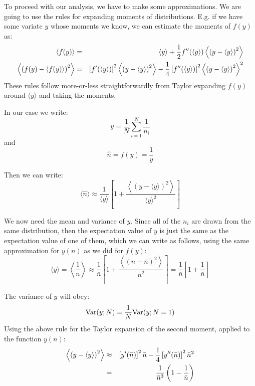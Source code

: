 \begin{enumerate}
\begin{answer}
To proceed with our analysis, we have to make some
approximations. We are going to use the rules for expanding
moments of distributions. E.g. if we have some variate $y$ whose
moments we know, we can estimate the moments of $f(y)$ as:
\begin{eqnarray}
 \langle f(y) \rangle &=& \langle y \rangle + \frac{1}{2}
 f''(\langle y \rangle)
 \left\langle \left(y - \langle y \rangle\right)^2 \right\rangle\cr
 \left\langle \left( f(y) - \langle f(y) \rangle\right)^2 \right\rangle &=&
 \left[f'(\langle y \rangle)\right]^2 
 \left\langle \left(y - \langle y \rangle\right)^2 \right\rangle -
 \frac{1}{4} \left[f''(\langle y \rangle)\right]^2 
 \left\langle \left(y - \langle y \rangle\right)^2 \right\rangle^2
\end{eqnarray}
These rules follow more-or-less straightforwardly from Taylor
expanding $f(y)$ around $\langle y \rangle$ and taking the moments.

In our case we write:
\begin{equation}
 y = \frac{1}{N} \sum_{i=1}^N \frac{1}{n_i}
\end{equation}
and 
\begin{equation}
 \hat n = f(y) = \frac{1}{y}
\end{equation}

Then we can write:
\begin{equation}
\langle \hat n \rangle \approx
\frac{1}{\langle y \rangle}
\left[ 1 + \frac{\left\langle \left(y - \langle
y \rangle\right)^2 \right\rangle}
{\langle y \rangle^2} \right]
\end{equation}

We now need the mean and variance of $y$. Since all of the $n_i$ are
drawn from the same distribution, then the expectation value of $y$ is
just the same as the expectation value of one of them, which we can
write as follows, using the same approximation for $y(n)$ as we did
for $f(y)$:
\begin{equation}
\langle y\rangle = \left\langle \frac{1}{n} \right\rangle
\approx \frac{1}{\bar n} \left[1+ \frac{\left\langle \left(n - \bar
n\right)^2\right\rangle}{\bar n^2}\right]
= \frac{1}{\bar n} \left[ 1 + \frac{1}{\bar n}\right]
\end{equation}

The variance of $y$ will obey:
\begin{equation}
{\rm Var}(y; N) = \frac{1}{N} {\rm Var}(y; N=1)
\end{equation}
Using the above rule for the Taylor expansion of the second moment,
applied to the function $y(n)$:
\begin{eqnarray}
\left\langle \left( y - \langle y \rangle \right)^2 \right\rangle
&\approx& \left[y'(\bar n)\right]^2  \bar n - \frac{1}{4} \left[y''(\bar
n)\right]^2 \bar n^2 \cr
&=& \frac{1}{\bar n^3} \left(1 - \frac{1}{\bar n}\right)
\end{eqnarray}


\end{answer}
\end{enumerate}
